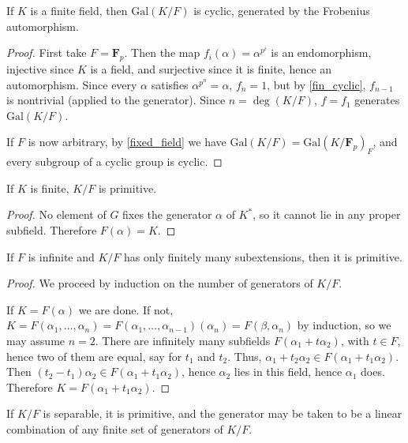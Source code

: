 \begin{lemma} If $K$ is a finite field, then $\text{Gal}(K/F)$ is cyclic,
generated by
the Frobenius automorphism.
\label{fin_gal_cyclic}
\end{lemma}

\begin{proof} First take $F = \mathbf{F}_p$. Then the map $f_i(\alpha) =
\alpha^{p^i}$ is an endomorphism, injective since $K$ is a field, and
surjective since it is finite, hence an automorphism. Since every $\alpha$
satisfies $\alpha^{p^n} = \alpha$, $f_n = 1$, but by \ref{fin_cyclic}, $f_{n -
1}$ is nontrivial (applied to the generator). Since $n = \deg(K/F)$, $f =
f_1$ generates $\text{Gal}(K/F)$.

If $F$ is now arbitrary, by \ref{fixed_field} we have $\text{Gal}(K/F) =
\text{Gal}(K/\mathbf{F}_p)_F$, and every subgroup of a cyclic group is cyclic.
\end{proof}

\begin{lemma} If $K$ is finite, $K/F$ is primitive.
\label{fin_prim_elt}
\end{lemma}

\begin{proof} No element of $G$ fixes the generator $\alpha$ of $K^\ast$, so
it cannot lie in any proper subfield. Therefore $F(\alpha) = K$. \end{proof}

\begin{proposition} If $F$ is infinite and $K/F$ has only finitely many
subextensions, then it is
primitive.
\label{gen_prim_elt}
\end{proposition}

\begin{proof} We proceed by induction on the number of generators of $K/F$.

If $K = F(\alpha)$ we are done. If not, $K = F(\alpha_1, \dots, \alpha_n) =
F(\alpha_1, \dots, \alpha_{n - 1})(\alpha_n) = F(\beta, \alpha_n)$ by
induction, so we may assume $n = 2$. There are infinitely many subfields
$F(\alpha_1 + t \alpha_2)$, with $t \in F$, hence two of them are equal, say
for $t_1$ and
$t_2$. Thus, $\alpha_1 + t_2 \alpha_2 \in F(\alpha_1 + t_1 \alpha_2)$. Then
$(t_2 - t_1)\alpha_2 \in F(\alpha_1 + t_1 \alpha_2)$, hence $\alpha_2$ lies in
this field, hence $\alpha_1$ does. Therefore $K = F(\alpha_1 + t_1
\alpha_2)$. \end{proof}

\begin{lemma} If $K/F$ is separable, it is primitive, and the generator may
be
taken to be a linear combination of any finite set of generators of $K/F$.
\label{prim_elt}
\end{lemma}

